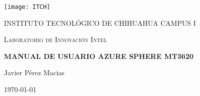 \begin{titlepage}
	\centering
	\texttt{[image: ITCH]}\par\vspace{1cm}
	{\textsc{INSTITUTO TECNOLÓGICO DE CHIHUAHUA CAMPUS I} \par}
	\vspace{0.5cm}
	{\textsc{Laboratorio de Innovación Intel} \par}
	\vspace{1cm}
	\vspace{1.5cm}
	{\huge\bfseries MANUAL DE USUARIO AZURE SPHERE MT3620 \par}
	\vspace{2cm}
	{\Large Javier Pérez Macias\par}
	\vfill
	{\large \today\par}
\end{titlepage}